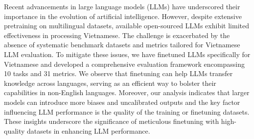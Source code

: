 Recent advancements in large language models (LLMs) have underscored their importance in the evolution of artificial intelligence. However, despite extensive pretraining on multilingual datasets, available open-sourced LLMs exhibit limited effectiveness in processing Vietnamese. The challenge is exacerbated by the absence of systematic benchmark datasets and metrics tailored for Vietnamese LLM evaluation. To mitigate these issues, we have finetuned LLMs specifically for Vietnamese and developed a comprehensive evaluation framework encompassing 10 tasks and 31 metrics. We observe that finetuning can help LLMs transfer knowledge across languages, serving as an efficient way to bolster their capabilities in non-English languages. Moreover, our analysis indicates that larger models can introduce more biases and uncalibrated outputs and the key factor influencing LLM performance is the quality of the training or finetuning datasets. These insights underscore the significance of meticulous finetuning with high-quality datasets in enhancing LLM performance.